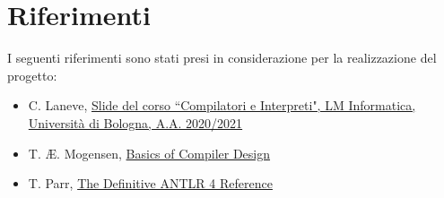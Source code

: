 \documentclass[../report.tex]{subfiles}
\begin{document}
\chapter{Riferimenti}\label{a:riferimenti}
I seguenti riferimenti sono stati presi in considerazione per la realizzazione del progetto:
\begin{itemize}
    \item C. Laneve, \href{https://virtuale.unibo.it/course/view.php?id=17652}{Slide del corso ``Compilatori e Interpreti", LM Informatica, Università di Bologna, A.A. 2020/2021}
    \item T. Æ. Mogensen, \href{http://hjemmesider.diku.dk/~torbenm/Basics/basics_lulu2.pdf}{Basics of Compiler Design}
    \item T. Parr, \href{https://pragprog.com/titles/tpantlr2/the-definitive-antlr-4-reference/}{The Definitive ANTLR 4 Reference}
\end{itemize}
\end{document}
